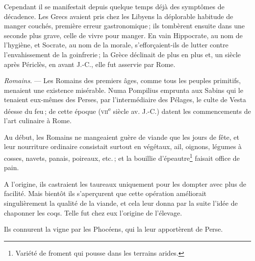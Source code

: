 Cependant il se manifestait depuis quelque temps déjà des symptômes de
décadence. Les Grecs avaient pris chez les Libyens la déplorable habitude de
manger couchés, première erreur gastronomique ; ils tombèrent ensuite dans une
seconde plus grave, celle de vivre pour manger. En vain Hippocrate, au nom de
l'hygiène, et Socrate, au nom de la morale, s'efforçaient-ils de lutter contre
l'envahissement de la goinfrerie ; la Grèce déclinait de plus en plus et, un
siècle après Périclès, en {\mmm} avant J.-C., elle fut asservie par
Rome.

\sk

\textit{Romains}. — Les Romains des premiers âges, comme tous les peuples
primitifs, menaient une existence misérable. Numa Pompilius emprunta aux Sabins
qui le tenaient eux-mêmes des Perses, par l'intermédiaire des Pélages, le culte
de Vesta déesse du feu ; de cette époque (\textsc{vii}\textsuperscript{e}
siècle av. J.-C.) datent les commencements de l'art culinaire à Rome.

Au début, les Romains ne mangeaient guère de viande que les jours de fête, et
leur nourriture ordinaire consistait surtout en végétaux, ail, oignons, légumes
à cosses, navets, panais, poireaux, etc. ; et la bouillie
d'épeautre\footnote{Variété de froment qui pousse dans les terrains arides.}
faisait office de pain.

A l’origine, ils castraient les taureaux uniquement pour les dompter avec plus
de facilité. Mais bientôt ils s'aperçurent que cette opération améliorait
singulièrement la qualité de la viande, et cela leur donna par la suite l'idée
de chaponner les coqs. Telle fut chez eux l'origine de l'élevage.

Ils connurent la vigne par les Phocéens, qui la leur apportèrent de Perse.

